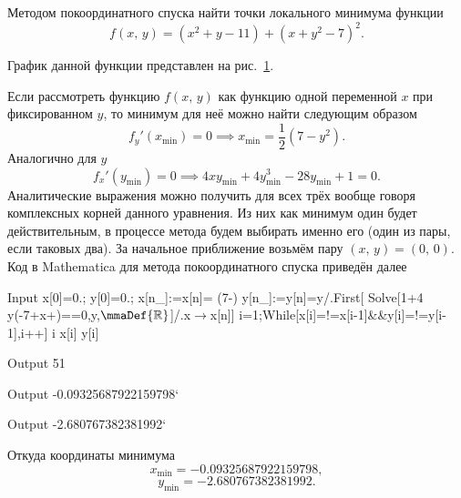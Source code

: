 \documentclass[a4paper]{article}
\begin{document}
\begin{hiProb}[7.5а]
Методом покоординатного спуска найти точки локального минимума
функции
\[
	f(x,\,y)=\left( x^2+y-11 \right) +(x+y^2-7)^2
.\] 
\end{hiProb}
\begin{sol}
	График данной функции представлен на рис.~\ref{fig:6}.
	\begin{figure}[htpb]
\caption{}
\label{fig:6}
\end{figure}
	Если рассмотреть функцию $f(x,\,y)$ как функцию одной
	переменной $x$ при фиксированном $y$, то минимум
	для неё можно найти следующим образом
	\[
		f_y'(x_{\text{min}})=0 \implies x_\text{min}=
		\frac{1}{2}\left( 7-y^2 \right) 
	.\]
	Аналогично для $y$ 
	\[
		f_x'(y_\text{min})=0\implies4 x y_{\min }+4 y_{\min }^3-28 y_{\min }+1=0
	.\]
	Аналитические выражения можно получить для всех трёх
	вообще говоря комплексных корней данного уравнения.
	Из них как минимум один будет действительным, в
	процессе метода будем выбирать именно его (один
	из пары, если таковых два).
	За начальное приближение возьмём пару
	$(x,\,y)=(0,\,0)$. Код в Mathematica для метода
	покоординатного спуска приведён далее
\begin{mmaCell}[moredefined={x, y, i},morepattern={n_, n}]{Input}
  x[0]=0.;
  y[0]=0.;
  x[n_]:=x[n]= (7-)
  y[n_]:=y[n]=y/.First[
  Solve[1+4 y(-7+x+)==0,y,\(\mmaDef{\mathbb{R}}\)]/.x\(\pmb{\to}\)x[n]]
  i=1;While[x[i]=!=x[i-1]&&y[i]=!=y[i-1],i++] 
  i
  x[i]
  y[i]
\end{mmaCell}
\begin{mmaCell}[]{Output}
  51
\end{mmaCell}
\begin{mmaCell}{Output}
  -0.09325687922159798`
\end{mmaCell}
\begin{mmaCell}{Output}
  -2.680767382381992`
\end{mmaCell}
Откуда координаты минимума
\[
x_\text{min} = -0.09325687922159798
,\] 
\[
y_\text{min} =
  -2.680767382381992
.\] 
\end{sol}
\end{document}
